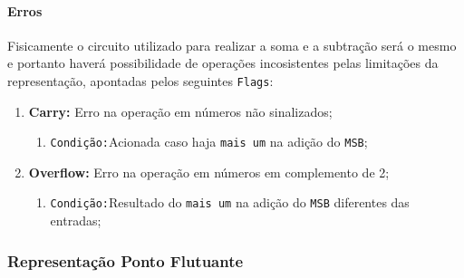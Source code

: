 \documentclass{article}
\begin{document}
            \paragraph{Erros}Fisicamente o circuito utilizado para realizar a soma e a subtração será o mesmo e portanto haverá possibilidade de operações incosistentes pelas limitações da representação, apontadas pelos seguintes \texttt{Flags}:
                \begin{enumerate}
                    \item \textbf{Carry:} Erro na operação em números não sinalizados;
                        \begin{enumerate}
                            \item \texttt{Condição:}Acionada caso haja \texttt{mais um} na adição do \texttt{MSB};
                        \end{enumerate}

                    \item \textbf{Overflow:} Erro na operação em números em complemento de 2;
                        \begin{enumerate}
                            \item \texttt{Condição:}Resultado do \texttt{mais um} na adição do \texttt{MSB} diferentes das entradas;
                        \end{enumerate}
                \end{enumerate}

            \subsubsection{Representação Ponto Flutuante}
\end{document}
